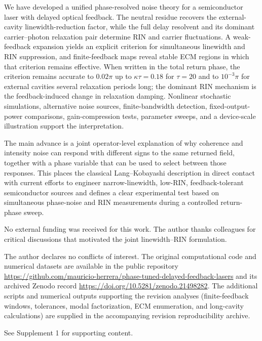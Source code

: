 \documentclass{optica-article}
\newif\ifmarked
\newcommand{\rev}[1]{\ifmarked{\color{blue}#1}\else#1\fi}
\begin{document}
We have developed a unified phase-resolved noise theory for a semiconductor laser with delayed optical feedback. The neutral residue recovers the external-cavity linewidth-reduction factor, while the full delay resolvent and its dominant carrier--photon relaxation pair determine RIN and carrier fluctuations. A weak-feedback expansion yields an explicit criterion for simultaneous linewidth and RIN suppression, and finite-feedback maps reveal stable ECM regions in which that criterion remains effective. \rev{When written in the total return phase, the criterion remains accurate to $0.02\pi$ up to $\kappa\tau=0.18$ for $\tau=20$ and to $10^{-3}\pi$ for external cavities several relaxation periods long; the dominant RIN mechanism is the feedback-induced change in relaxation damping.} Nonlinear stochastic simulations, alternative noise sources, finite-bandwidth detection, fixed-output-power comparisons, gain-compression tests, parameter sweeps, and a device-scale illustration support the interpretation.

The main advance is a joint operator-level explanation of why coherence and intensity noise can respond with different signs to the same returned field, together with a phase variable that can be used to select between those responses. This places the classical Lang--Kobayashi description in direct contact with current efforts to engineer narrow-linewidth, low-RIN, feedback-tolerant semiconductor sources and defines a clear experimental test based on simultaneous phase-noise and RIN measurements during a controlled return-phase sweep.

\begin{backmatter}
 No external funding was received for this work.
 The author thanks colleagues for critical discussions that motivated the joint linewidth--RIN formulation.

 The author declares no conflicts of interest.
The original computational code and numerical datasets are available in the public
repository \url{https://github.com/mauricio-herrera/phase-tuned-delayed-feedback-lasers}
and its archived Zenodo record \url{https://doi.org/10.5281/zenodo.21498282}.
\rev{The additional scripts and numerical outputs supporting the revision analyses
(finite-feedback windows, tolerances, modal factorization, ECM enumeration,
and long-cavity calculations) are supplied in the accompanying revision
reproducibility archive.}

 See Supplement 1 for supporting content.
\end{backmatter}
\end{document}
